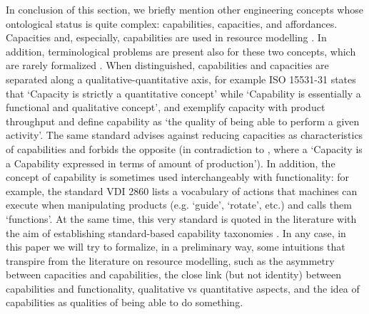 \documentclass[sw]{iosart2x}
\newcommand{\quotes}[1]{`#1'}
\begin{document}
\medskip
In conclusion of this section, we briefly mention other engineering concepts whose ontological status is quite complex: capabilities, capacities, and affordances. 
Capacities and, especially, capabilities are used in resource modelling \cite{jarvenpaaDevelopmentOntologyDescribing2019a, sarkarOntologyModelProcess2019, jochemISOISO15531312004, solanoKnowledgeRepresentationProduct2014, sanfilippoOntologicalModelingManufacturing2021}. In addition, terminological problems are present also for these two concepts, which are rarely formalized \cite{sanfilippoResourcesManufacturing2015, borgoCapabilitiesCapacitiesFunctionalities2021}. When distinguished, capabilities and capacities are separated along a qualitative-quantitative axis, for example ISO 15531-31\cite{jochemISOISO15531312004} states that \quotes{Capacity is strictly a quantitative concept} while \quotes{Capability is essentially a functional and qualitative concept}, and exemplify capacity with product throughput and define capability as \quotes{the quality of being able to perform a given activity}. The same standard advises against reducing capacities as characteristics of capabilities and forbids the opposite (in contradiction to \cite{solanoKnowledgeRepresentationProduct2014}, where a \quotes{Capacity is a Capability
expressed in terms of amount of production}). 
In addition, the concept of capability is sometimes used interchangeably with functionality: for example, the standard VDI 2860 \cite{VDI2860Assembly1990} lists a vocabulary of actions that machines can execute when manipulating products (e.g. `guide', `rotate', etc.) and calls them `functions'. At the same time, this very standard is quoted in the literature with the aim of establishing standard-based capability taxonomies \cite{kocherFormalCapabilitySkill2020a, kocherReferenceModelCommon2022}.
In any case, in this paper we will try to formalize, in a preliminary way, some intuitions that transpire from the literature on resource modelling, such as the asymmetry between capacities and capabilities, the close link (but not identity) between capabilities and functionality, qualitative vs quantitative aspects, and the idea of capabilities as qualities of being able to do something.
\end{document}
